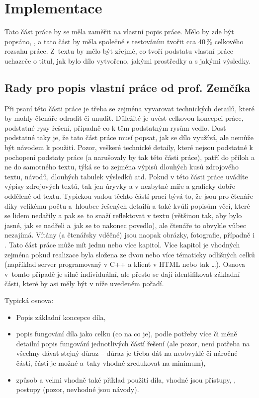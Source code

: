 \section{Implementace}
\label{implementace}

Tato část práce by se měla zaměřit na vlastní popis práce. Mělo by zde být popsáno, , a tato část by měla společně s testováním tvořit cca 40\,\% celkového rozsahu práce. Z~textu by mělo být zřejmé, co tvoří podstatu vlastní práce uchazeče o titul, jak bylo dílo vytvořeno, jakými prostředky a s jakými výsledky.

\subsection*{Rady pro popis vlastní práce od prof. Zemčíka}

Při psaní této části práce je třeba se zejména vyvarovat technických detailů, které by mohly čtenáře odradit či unudit. Důležité je uvést celkovou koncepci práce, podstatné rysy řešení, případně co k těm podstatným rysům vedlo. Dost podstatné taky je, že tato část práce musí popsat, jak se dílo využívá, ale nemůže být návodem k použití. Pozor, veškeré technické detaily, které nejsou podstatné k pochopení podstaty práce (a narušovaly by tak  této části práce), patří do příloh a ne do samotného textu, týká se to zejména výpisů dlouhých kusů zdrojového textu, návodů, dlouhých tabulek výsledků atd. Pokud v této části práce uvádíte výpisy zdrojových textů, tak jen úryvky a v nezbytné míře a graficky dobře oddělené od textu. Typickou vadou těchto částí prací bývá to, že jsou pro čtenáře  díky velikému počtu a~hloubce řešených detailů a také kvůli popisům věcí, které se lidem nedařily a pak se~to  snaží reflektovat v textu (většinou tak, aby bylo jasné, jak se nadřeli a~jak se to nakonec povedlo), ale čtenáře to obvykle vůbec nezajímá. Vítány (a čtenářsky vděčné) jsou naopak obrázky, fotografie, případně i . Tato část práce může mít jednu nebo více kapitol. Více kapitol je vhodných zejména pokud realizace byla složena ze dvou nebo více tématicky odlišných celků (například server programovaný v C++ a klient v HTML nebo tak \ldots). Osnova v~tomto případě je silně individuální, ale přesto se dají identifikovat základní části, které by asi měly být v níže uvedeném pořadí.
\bigskip

\begin{samepage}
\noindent Typická osnova:
\begin{itemize}
  \item{Popis základní koncepce díla,}
  \item{popis fungování díla jako celku (co na co je), podle potřeby více či méně detailní popis fungování jednotlivých částí řešení (ale pozor, není potřeba na všechny dávat stejný důraz -- důraz je třeba dát na neobvyklé či náročné části,  části je možné a~taky vhodné zredukovat na minimum),}
  \item{způsob a velmi vhodně také příklad použití díla, vhodné jsou  přístupy, , postupy (pozor, nevhodné jsou návody).}
\end{itemize}
\end{samepage}

